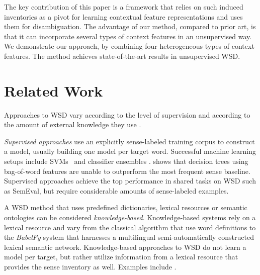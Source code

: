 \documentclass[11pt]{article}
\begin{document}
The key contribution of this paper is a framework that relies on such induced inventories as a pivot for learning contextual feature representations and uses them for disambiguation. The advantage of our method, compared to prior art, is that it can incorporate several types of context features in an unsupervised way. We demonstrate our approach, by combining four heterogeneous types of context features. The method achieves state-of-the-art results in unsupervised WSD.  
	


\section{Related Work}
\label{sec:relatedwork}

Approaches to WSD vary according to the level of supervision and according to the amount of external knowledge they use \cite{agirre2007word,Navigli2009}.  

\textit{Supervised approaches} use an explicitly sense-labeled training corpus to construct a model, usually building one model per target word. Successful machine learning setups include SVMs~\cite{Lee2002} and classifier ensembles \cite{Klein2002}.  shows that decision trees using bag-of-word features are unable to outperform the  most frequent sense baseline. 
Supervised approaches achieve the top performance in shared tasks on WSD such as SemEval, but require considerable amounts of sense-labeled examples. 

A WSD method that uses predefined dictionaries, lexical resources or semantic ontologies can be considered \emph{knowledge-based}. Knowledge-based systems rely on a lexical resource and vary from the classical  algorithm that use word definitions to the \textit{BabelFy} \cite{moro2014entity} system that harnesses a multilingual semi-automatically constructed lexical semantic network. Knowledge-based approaches to WSD do not learn a model per target, but rather utilize information from a lexical resource that provides the sense inventory as well. Examples include \cite{Lesk1986,banerjee2002adapted,pedersen2005maximizing}.  %
\end{document}
